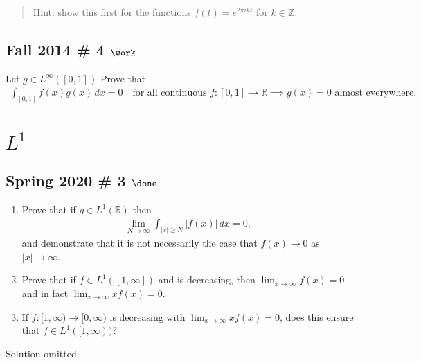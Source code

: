 \begin{quote}
Hint: show this first for the functions \(f(t) = e^{2\pi i k t}\) for
\(k\in {\mathbb{Z}}\).
\end{quote}

\hypertarget{fall-2014-4-work}{%
\subsection{\texorpdfstring{Fall 2014 \# 4
\(\work\)}{Fall 2014 \# 4 \textbackslash work}}\label{fall-2014-4-work}}

Let \(g\in L^\infty([0, 1])\) Prove that
\begin{align*}
\int _{[0,1]} f(x) g(x)\, dx = 0 
\quad\text{for all continuous } f:[0, 1] \to {\mathbb{R}}
\implies g(x) = 0 \text{ almost everywhere. }
\end{align*}

\hypertarget{l1}{%
\section{\texorpdfstring{\(L^1\)}{L\^{}1}}\label{l1}}

\hypertarget{spring-2020-3-done}{%
\subsection{\texorpdfstring{Spring 2020 \# 3
\(\done\)}{Spring 2020 \# 3 \textbackslash done}}\label{spring-2020-3-done}}

\begin{enumerate}
\def\labelenumi{\alph{enumi}.}
\item
  Prove that if \(g\in L^1({\mathbb{R}})\) then
  \begin{align*}
  \lim_{N\to \infty} \int _{{\left\lvert {x} \right\rvert} \geq N} {\left\lvert {f(x)} \right\rvert} \, dx = 0
  ,\end{align*}
  and demonstrate that it is not necessarily the case that
  \(f(x) \to 0\) as \({\left\lvert {x} \right\rvert}\to \infty\).
\item
  Prove that if \(f\in L^1([1, \infty])\) and is decreasing, then
  \(\lim_{x\to\infty}f(x) =0\) and in fact
  \(\lim_{x\to \infty} xf(x) = 0\).
\item
  If \(f: [1, \infty) \to [0, \infty)\) is decreasing with
  \(\lim_{x\to \infty} xf(x) = 0\), does this ensure that
  \(f\in L^1([1, \infty))\)?
\end{enumerate}

Solution omitted.


